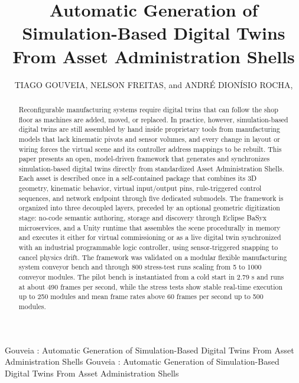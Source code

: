 \documentclass{ieeeojies}
\begin{document}
\title{Automatic Generation of Simulation-Based Digital Twins From Asset Administration Shells}

\author{\uppercase{Tiago Gouveia},
\uppercase{Nelson Freitas}, and
\uppercase{Andr{\'e} Dion{\'i}sio Rocha}, }
\address[1]{Department of Electrical and Computer Engineering, NOVA School of Science and Technology (NOVA FCT), NOVA University of Lisbon, 2829-516 Caparica, Portugal (e-mail: td.gouveia@campus.fct.unl.pt; n.freitas@campus.fct.unl.pt; ad.rocha@fct.unl.pt)}
\address[2]{Centre of Technology and Systems (CTS), UNINOVA, 2829-516 Caparica, Portugal}

\markboth
{Gouveia \headeretal: Automatic Generation of Simulation-Based Digital Twins From Asset Administration Shells}
{Gouveia \headeretal: Automatic Generation of Simulation-Based Digital Twins From Asset Administration Shells}


\begin{abstract}
Reconfigurable manufacturing systems require digital twins that can follow the shop floor as machines are added, moved, or replaced. In practice, however, simulation-based digital twins are still assembled by hand inside proprietary tools from manufacturing models that lack kinematic pivots and sensor volumes, and every change in layout or wiring forces the virtual scene and its controller address mappings to be rebuilt. This paper presents an open, model-driven framework that generates and synchronizes simulation-based digital twins directly from standardized Asset Administration Shells. Each asset is described once in a self-contained package that combines its 3D geometry, kinematic behavior, virtual input/output pins, rule-triggered control sequences, and network endpoint through five dedicated submodels. The framework is organized into three decoupled layers, preceded by an optional geometric digitization stage: no-code semantic authoring, storage and discovery through Eclipse BaSyx microservices, and a Unity runtime that assembles the scene procedurally in memory and executes it either for virtual commissioning or as a live digital twin synchronized with an industrial programmable logic controller, using sensor-triggered snapping to cancel physics drift. The framework was validated on a modular flexible manufacturing system conveyor bench and through 800 stress-test runs scaling from 5 to 1000 conveyor modules. The pilot bench is instantiated from a cold start in 2.79 s and runs at about 490 frames per second, while the stress tests show stable real-time execution up to 250 modules and mean frame rates above 60 frames per second up to 500 modules.
\end{abstract}
\end{document}

